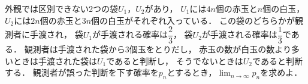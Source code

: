 \documentclass[../../main.tex]{subfiles}
\begin{document}
外観では区別できない2つの袋$U_1$，$U_2$があり，
$U_1$には$4n$個の赤玉と$n$個の白玉，$U_2$には$2n$個の赤玉と$3n$個の白玉がそれぞれ入っている．
この袋のどちらかが観測者に手渡され，
袋$U_1$が手渡される確率は$\displaystyle\dfrac{2}{3}$，
袋$U_2$が手渡される確率は$\displaystyle\dfrac{1}{3}$である．
観測者は手渡された袋から3個玉をとりだし，
赤玉の数が白玉の数より多いときは手渡された袋は$U_1$であると判断し，
そうでないときは$U_2$であると判断する．
観測者が誤った判断を下す確率を$p_n$とするとき，$\displaystyle\lim_{n\to\infty}p_n$を求めよ．
\end{document}
